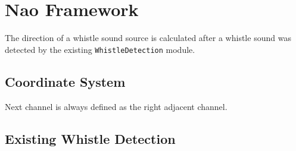 \section{Nao Framework}
\label{sec:03_whistleLocalizationModule}

The direction of a whistle sound source is calculated after a whistle sound was detected
by the existing \lstinline!WhistleDetection! module.

\subsection{Coordinate System}
\label{subsec:03_coordinates}

Next channel is always defined as the right adjacent channel.

\subsection{Existing Whistle Detection}
\label{subsec:03_whistleDetection}